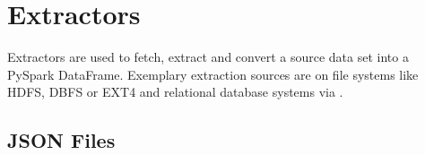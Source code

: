\documentclass[a4paper,10pt, twoside,english]{sphinxmanual}
\begin{document}
\section{Extractors}
\label{\detokenize{extractor/overview:module-spooq2.extractor.extractor}}\label{\detokenize{extractor/overview:extractors}}\label{\detokenize{extractor/overview::doc}}
Extractors are used to fetch, extract and convert a source data set into a PySpark DataFrame.
Exemplary extraction sources are  on file systems like HDFS, DBFS or EXT4
and relational database systems via .


\subsection{JSON Files}
\label{\detokenize{extractor/json:module-spooq2.extractor.json_files}}\label{\detokenize{extractor/json:json-files}}\label{\detokenize{extractor/json::doc}}
\end{document}

